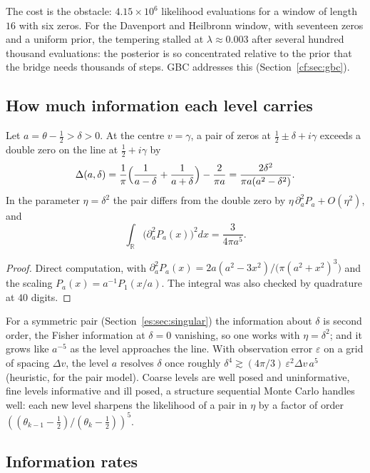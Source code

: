 The cost is the obstacle: $4.15\times10^6$ likelihood evaluations for a window of length $16$ with six zeros. For the Davenport and Heilbronn window, with seventeen zeros and a uniform prior, the tempering stalled at $\lambda\approx0.003$ after several hundred thousand evaluations: the posterior is so concentrated relative to the prior that the bridge needs thousands of steps. GBC addresses this (Section~\ref{cf:sec:gbc}).

\subsection{How much information each level carries}\label{cf:sec:detect}

\begin{proposition}[detectability]\label{cf:prop:detect}
Let $a=\theta-\frac12>\delta>0$. At the centre $v=\gamma$, a pair of zeros at $\frac12\pm\delta+i\gamma$ exceeds a double zero on the line at $\frac12+i\gamma$ by
\[
\Delta(a,\delta)=\frac1\pi\Bigl(\frac1{a-\delta}+\frac1{a+\delta}\Bigr)-\frac2{\pi a}=\frac{2\delta^2}{\pi a(a^2-\delta^2)}.
\]
In the parameter $\eta=\delta^2$ the pair differs from the double zero by $\eta\,\partial_a^2P_a+O(\eta^2)$, and
\[
\int_{\mathbb R}\bigl(\partial_a^2P_a(x)\bigr)^2dx=\frac3{4\pi a^5}.
\]
\end{proposition}

\begin{proof}
Direct computation, with $\partial_a^2P_a(x)=2a(a^2-3x^2)/\bigl(\pi(a^2+x^2)^3\bigr)$ and the scaling $P_a(x)=a^{-1}P_1(x/a)$. The integral was also checked by quadrature at $40$ digits.
\end{proof}

For a symmetric pair (Section~\ref{es:sec:singular}) the information about $\delta$ is second order, the Fisher information at $\delta=0$ vanishing, so one works with $\eta=\delta^2$; and it grows like $a^{-5}$ as the level approaches the line. With observation error $\varepsilon$ on a grid of spacing $\Delta v$, the level $a$ resolves $\delta$ once roughly $\delta^4\gtrsim(4\pi/3)\,\varepsilon^2\Delta v\,a^5$ (heuristic, for the pair model). Coarse levels are well posed and uninformative, fine levels informative and ill posed, a structure sequential Monte Carlo handles well: each new level sharpens the likelihood of a pair in $\eta$ by a factor of order $((\theta_{k-1}-\frac12)/(\theta_k-\frac12))^5$.

\subsection{Information rates}

